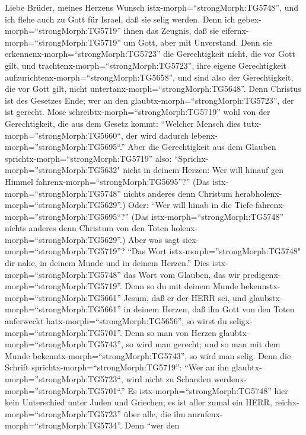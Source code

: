 Liebe Brüder, meines Herzens Wunsch
istx-morph=``strongMorph:TG5748'', und ich flehe auch zu Gott für
Israel, daß sie selig werden.  Denn ich
gebex-morph=``strongMorph:TG5719'' ihnen das Zeugnis, daß sie
eifernx-morph=``strongMorph:TG5719'' um Gott, aber mit Unverstand.
 Denn sie erkennenx-morph=``strongMorph:TG5723'' die
Gerechtigkeit nicht, die vor Gott gilt, und
trachtenx-morph=``strongMorph:TG5723'', ihre eigene Gerechtigkeit
aufzurichtenx-morph=``strongMorph:TG5658'', und sind also der
Gerechtigkeit, die vor Gott gilt, nicht
untertanx-morph=``strongMorph:TG5648''.  Denn Christus ist
des Gesetzes Ende; wer an den glaubtx-morph=``strongMorph:TG5723'', der
ist gerecht.  Mose schreibtx-morph=``strongMorph:TG5719''
wohl von der Gerechtigkeit, die aus dem Gesetz kommt: ``Welcher Mensch
dies tutx-morph=''strongMorph:TG5660``, der wird dadurch
lebenx-morph=''strongMorph:TG5695``.''  Aber die
Gerechtigkeit aus dem Glauben sprichtx-morph=``strongMorph:TG5719''
also: ``Sprichx-morph=''strongMorph:TG5632" nicht in deinem Herzen: Wer
will hinauf gen Himmel fahrenx-morph=``strongMorph:TG5695''?'' (Das
istx-morph=``strongMorph:TG5748'' nichts anderes denn Christum
herabholenx-morph=``strongMorph:TG5629''.)  Oder: ``Wer will
hinab in die Tiefe fahrenx-morph=''strongMorph:TG5695``?'' (Das
istx-morph=``strongMorph:TG5748'' nichts anderes denn Christum von den
Toten holenx-morph=``strongMorph:TG5629''.)  Aber was sagt
siex-morph=``strongMorph:TG5719''? ``Das Wort
istx-morph=''strongMorph:TG5748" dir nahe, in deinem Munde und in deinem
Herzen.'' Dies istx-morph=``strongMorph:TG5748'' das Wort vom Glauben,
das wir predigenx-morph=``strongMorph:TG5719''.  Denn so du
mit deinem Munde bekennstx-morph=``strongMorph:TG5661'' Jesum, daß er
der HERR sei, und glaubstx-morph=``strongMorph:TG5661'' in deinem
Herzen, daß ihn Gott von den Toten auferweckt
hatx-morph=``strongMorph:TG5656'', so wirst du
seligx-morph=``strongMorph:TG5701''.  Denn so man von
Herzen glaubtx-morph=``strongMorph:TG5743'', so wird man gerecht; und so
man mit dem Munde bekenntx-morph=``strongMorph:TG5743'', so wird man
selig.  Denn die Schrift
sprichtx-morph=``strongMorph:TG5719'': ``Wer an ihn
glaubtx-morph=''strongMorph:TG5723``, wird nicht zu Schanden
werdenx-morph=''strongMorph:TG5701``.''  Es
istx-morph=``strongMorph:TG5748'' hier kein Unterschied unter Juden und
Griechen; es ist aller zumal ein HERR,
reichx-morph=``strongMorph:TG5723'' über alle, die ihn
anrufenx-morph=``strongMorph:TG5734''.  Denn ``wer den
